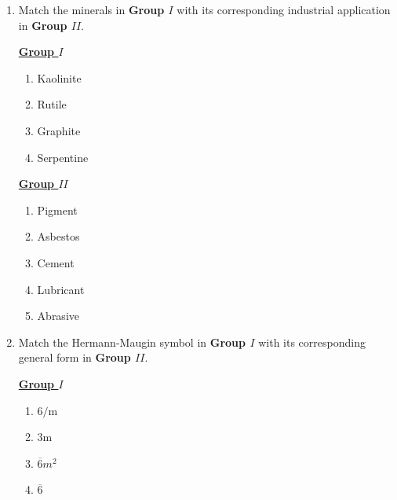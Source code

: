 \documentclass[journal,12pt,onecolumn]{IEEEtran}
\theoremstyle{remark}
\begin{document}
\begin{enumerate}
\begin{enumerate}
            \end{enumerate}
\newpage
        \item Match the minerals in \textbf{Group $I$} with its corresponding industrial application in  \textbf{Group $II$}. \hfill{}

        \begin{multicols}{2}
            \underline{\textbf{Group $I$}}
            \begin{enumerate}[start =16]
                \item Kaolinite
                \item Rutile
                \item Graphite
                \item Serpentine
            \end{enumerate}

            \columnbreak

            \underline{\textbf{Group $II$}}
            \begin{enumerate}
                \item Pigment
                \item Asbestos
                \item Cement
                \item Lubricant
                \item Abrasive
            \end{enumerate}
        \end{multicols}

        \begin{enumerate}
        \end{enumerate}

        \item  Match the Hermann-Maugin symbol in \textbf{Group $I$} with its corresponding general form in \textbf{Group $II$}. \hfill{}
         
        \begin{multicols}{2}
            \underline{\textbf{Group $I$}}
            \begin{enumerate}[start =16]
                \item $6\text{/m}$
                \item $3\text{m}$
                \item $\overline{6}m^{2}$
                \item $\overline{6}$
            \end{enumerate}


\end{multicols}
\end{enumerate}
\end{document}
